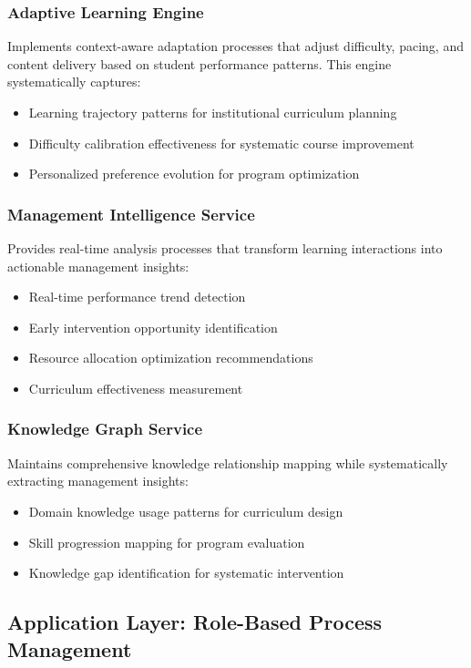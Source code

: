 \documentclass[conference]{IEEEtran}
\begin{document}
\subsubsection{Adaptive Learning Engine}
Implements context-aware adaptation processes that adjust difficulty, pacing, and content delivery based on student performance patterns. This engine systematically captures:
\begin{itemize}
    \item Learning trajectory patterns for institutional curriculum planning
    \item Difficulty calibration effectiveness for systematic course improvement
    \item Personalized preference evolution for program optimization
\end{itemize}

\subsubsection{Management Intelligence Service}
Provides real-time analysis processes that transform learning interactions into actionable management insights:
\begin{itemize}
    \item Real-time performance trend detection
    \item Early intervention opportunity identification
    \item Resource allocation optimization recommendations
    \item Curriculum effectiveness measurement
\end{itemize}

\subsubsection{Knowledge Graph Service}
Maintains comprehensive knowledge relationship mapping while systematically extracting management insights:
\begin{itemize}
    \item Domain knowledge usage patterns for curriculum design
    \item Skill progression mapping for program evaluation
    \item Knowledge gap identification for systematic intervention
\end{itemize}

\subsection{Application Layer: Role-Based Process Management}
\end{document}
